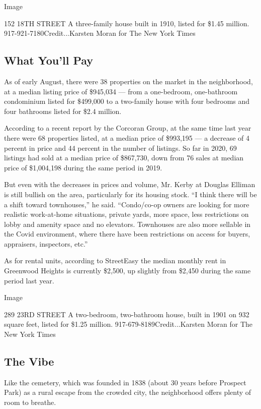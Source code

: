 Image

152 18TH STREET \textbar{} A three-family house built in 1910, listed
for \$1.45 million. 917-921-7180Credit...Karsten Moran for The New York
Times

\hypertarget{what-youll-pay}{%
\subsection{What You'll Pay}\label{what-youll-pay}}

As of early August, there were 38 properties on the market in the
neighborhood, at a median listing price of \$945,034 --- from a
one-bedroom, one-bathroom condominium listed for \$499,000 to a
two-family house with four bedrooms and four bathrooms listed for \$2.4
million.

According to a recent report by the Corcoran Group, at the same time
last year there were 68 properties listed, at a median price of
\$993,195 --- a decrease of 4 percent in price and 44 percent in the
number of listings. So far in 2020, 69 listings had sold at a median
price of \$867,730, down from 76 sales at median price of \$1,004,198
during the same period in 2019.

But even with the decreases in prices and volume, Mr. Kerby at Douglas
Elliman is still bullish on the area, particularly for its housing
stock. ``I think there will be a shift toward townhouses,'' he said.
``Condo/co-op owners are looking for more realistic work-at-home
situations, private yards, more space, less restrictions on lobby and
amenity space and no elevators. Townhouses are also more sellable in the
Covid environment, where there have been restrictions on access for
buyers, appraisers, inspectors, etc.''

As for rental units, according to StreetEasy the median monthly rent in
Greenwood Heights is currently \$2,500, up slightly from \$2,450 during
the same period last year.

Image

289 23RD STREET \textbar{} A two-bedroom, two-bathroom house, built in
1901 on 932 square feet, listed for \$1.25 million.
917-679-8189Credit...Karsten Moran for The New York Times

\hypertarget{the-vibe}{%
\subsection{The Vibe}\label{the-vibe}}

Like the cemetery, which was founded in 1838 (about 30 years before
Prospect Park) as a rural escape from the crowded city, the neighborhood
offers plenty of room to breathe.

